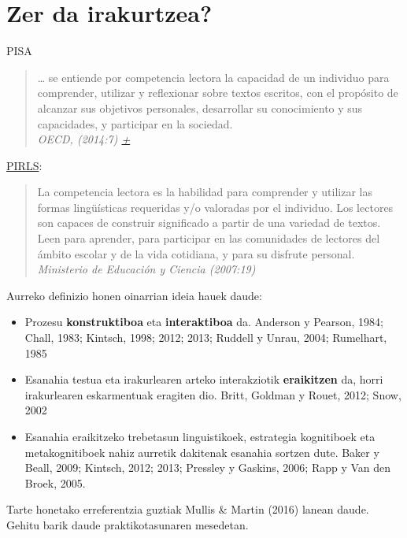 \documentclass[]{book}
\providecommand{\tightlist}{%
  \setlength{\itemsep}{0pt}\setlength{\parskip}{0pt}}
\begin{document}
\hypertarget{zer-da-irakurtzea}{%
\section{Zer da irakurtzea?}\label{zer-da-irakurtzea}}

PISA

\begin{quote}
\ldots{} se entiende por competencia lectora la capacidad de un individuo para comprender, utilizar y reflexionar sobre textos escritos, con el propósito de alcanzar sus objetivos personales, desarrollar su conocimiento y sus capacidades, y participar en la sociedad.\\
\emph{OECD, (2014:7) \href{https://www.oecd.org/pisa/39730818.pdf}{+}}
\end{quote}

\href{https://en.wikipedia.org/wiki/Progress_in_International_Reading_Literacy_Study}{PIRLS}:

\begin{quote}
La competencia lectora es la habilidad para comprender y utilizar las formas lingüísticas requeridas y/o valoradas por el individuo. Los lectores son capaces de construir significado a partir de una variedad de textos. Leen para aprender, para participar en las comunidades de lectores del ámbito escolar y de la vida cotidiana, y para su disfrute personal.\\
\emph{Ministerio de Educación y Ciencia (2007:19)}
\end{quote}

Aurreko definizio honen oinarrian ideia hauek daude:

\begin{itemize}
\tightlist
\item
  Prozesu \textbf{konstruktiboa} eta \textbf{interaktiboa} da.
  Anderson y Pearson, 1984; Chall, 1983; Kintsch, 1998; 2012; 2013; Ruddell y Unrau, 2004; Rumelhart, 1985
\item
  Esanahia testua eta irakurlearen arteko interakziotik \textbf{eraikitzen} da, horri irakurlearen eskarmentuak eragiten dio.
  Britt, Goldman y Rouet, 2012; Snow, 2002
\item
  Esanahia eraikitzeko trebetasun linguistikoek, estrategia kognitiboek eta metakognitiboek nahiz aurretik dakitenak esanahia sortzen dute.
  Baker y Beall, 2009; Kintsch, 2012; 2013; Pressley y Gaskins, 2006; Rapp y Van den Broek, 2005.
\end{itemize}

Tarte honetako erreferentzia guztiak Mullis \& Martin (2016) lanean daude. Gehitu barik daude praktikotasunaren mesedetan.
\end{document}
